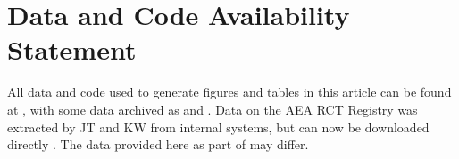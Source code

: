 \documentclass[PP]{AEA}
\begin{document}
\section{Data and Code Availability Statement}
\label{sec:dcas}

All data and code used to generate figures and tables in this article can be found at \citet{E117884V1}, with some data archived as \citet{E117873V1} and \citet{E117876V1}. Data on the AEA RCT Registry was extracted by JT and KW from internal systems, but can now be downloaded directly \citep{DVN/DFMLIU_2020}. The data provided here as part of \citet{E117884V1} may differ.

\FloatBarrier
%
%



\appendix

%
\end{document}
